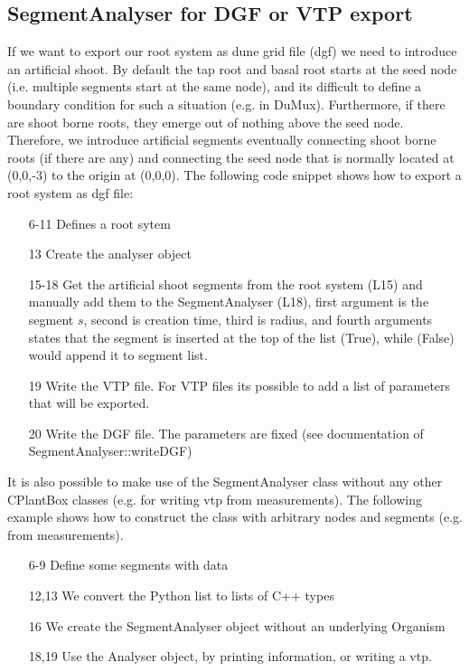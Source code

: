 \subsection{SegmentAnalyser for DGF or VTP export}

If we want to export our root system as dune grid file (dgf) we need to introduce an artificial shoot. By default the tap root and basal root starts at the seed node (i.e. multiple segments start at the same node), and its difficult to define a boundary condition for such a situation (e.g. in DuMux). Furthermore, if there are shoot borne roots, they emerge out of nothing above the seed node. Therefore, we introduce artificial segments eventually connecting shoot borne roots (if there are any) and connecting the seed node that is normally located at (0,0,-3) to the origin at (0,0,0). The following code snippet shows how to export a root system as dgf file:



\begin{itemize}
 \item[6-11] Defines a root sytem
 \item[13] Create the analyser object
 \item[15-18] Get the artificial shoot segments from the root system (L15) and manually add them to the SegmentAnalyser (L18), first argument is the segment $s$, second is creation time, third is radius, and fourth arguments states that the segment is inserted at the top of the list (True), while (False) would append it to segment list.
 \item[19] Write the VTP file. For VTP files its possible to add a list of parameters that will be exported. 
 \item[20] Write the DGF file. The parameters are fixed (see documentation of SegmentAnalyser::writeDGF)
\end{itemize}

It is also possible to make use of the SegmentAnalyser class without any other CPlantBox classes (e.g. for writing vtp from measurements). The following example shows how to construct the class with arbitrary nodes and segments (e.g. from measurements). 



\begin{itemize}
 \item[6-9] Define some segments with data
 \item[12,13] We convert the Python list to lists of C++ types
 \item[16] We create the SegmentAnalyser object without an underlying Organism
 \item[18,19] Use the Analyser object, by printing information, or writing a vtp. 
\end{itemize}

